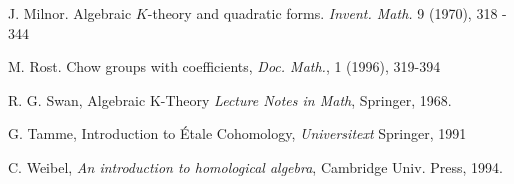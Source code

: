 \begin{thebibliography}{10}
J. Milnor.
Algebraic $K$-theory and quadratic forms.
{\em Invent. Math.} 9 (1970), 318 - 344

M. Rost.
Chow groups with coefficients,
{\em Doc. Math.}, 1 (1996), 319-394

R. G. Swan,
Algebraic K-Theory
{\em Lecture Notes in Math},
Springer, 1968.

G. Tamme,
Introduction to \'Etale Cohomology,
{\em Universitext}
Springer, 1991

C. Weibel,
{\em An introduction to homological algebra},
Cambridge Univ. Press, 1994.
\end{thebibliography}
